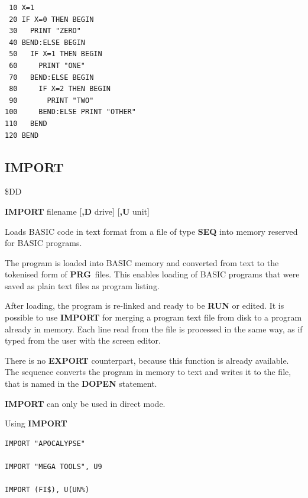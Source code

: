 \begin{description}[leftmargin=2cm,style=nextline]
\begin{tcolorbox}[colback=black,coltext=white]
\begin{verbatim}
 10 X=1
 20 IF X=0 THEN BEGIN
 30   PRINT "ZERO"
 40 BEND:ELSE BEGIN
 50   IF X=1 THEN BEGIN
 60     PRINT "ONE"
 70   BEND:ELSE BEGIN
 80     IF X=2 THEN BEGIN
 90       PRINT "TWO"
100     BEND:ELSE PRINT "OTHER"
110   BEND
120 BEND
\end{verbatim}
\end{tcolorbox}
\end{description}


\newpage
\subsection{IMPORT}
\begin{description}[leftmargin=2cm,style=nextline]
\item [Token:]    \$DD

\item [Format:]   {\bf IMPORT} filename [{\bf,D} drive] [{\bf,U} unit]

\item [Usage:]    Loads BASIC code in text format from a file of type {\bf SEQ} into memory reserved for BASIC programs.

                  \filenamedefinition

                  \drivedefinition

                  \unitdefinition

\item [Remarks:]  The program is loaded into BASIC memory and converted from text to the tokenised form of {\bf PRG} files. This enables loading of BASIC programs that were saved as plain text files as program listing.

                  After loading, the program is re-linked and ready to be {\bf RUN} or edited. It is possible to use {\bf IMPORT} for merging a program text file from disk to a program already in memory. Each line read from the file is processed in the same way, as if typed from the user with the screen editor.

                  There is no {\bf EXPORT} counterpart, because this function is already available. The sequence  converts the program in memory to text and writes it to the file, that is named in the {\bf DOPEN} statement.

                  {\bf IMPORT} can only be used in direct mode.

\item [Examples:] Using {\bf IMPORT}

\begin{tcolorbox}[colback=black,coltext=white]
\verbatimfont{\codefont}
\begin{verbatim}
IMPORT "APOCALYPSE"

IMPORT "MEGA TOOLS", U9

IMPORT (FI$), U(UN%)
\end{verbatim}
\end{tcolorbox}
\end{description}

